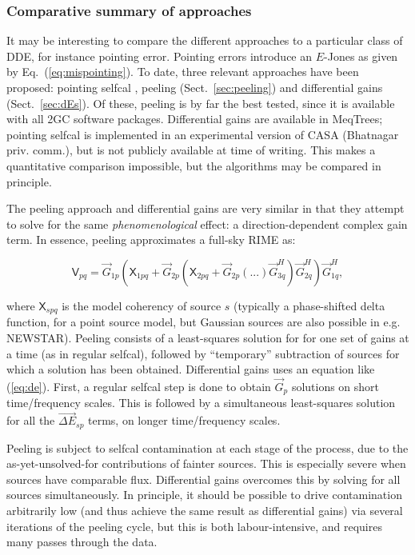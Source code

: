 \documentclass{aa}
\newcommand{\herm}{H}
\newcommand{\jones}[2]{\vec {#1}_{#2}}
\newcommand{\jonesT}[2]{\vec {#1}^{\herm}_{#2}}
\newcommand{\coh}[2]{\mathsf{{#1}}_{{#2}}}
\begin{document}
\subsubsection{Comparative summary of approaches}

It may be interesting to compare the different approaches to a particular class of DDE, for instance pointing error. Pointing errors introduce an $E$-Jones as given by Eq.~(\ref{eq:mispointing}). To date, three relevant approaches have been proposed: pointing selfcal \citep{SB:pointing}, peeling (Sect.~\ref{sec:peeling}) and differential gains (Sect.~\ref{sec:dEs}). Of these, peeling is by far the best tested, since it is available with all 2GC software packages. Differential gains are available in MeqTrees; pointing selfcal is implemented in an experimental version of CASA (Bhatnagar priv. comm.), but is not publicly available at time of writing. This makes a quantitative comparison impossible, but the algorithms may be compared in principle.

The peeling approach and differential gains are very similar in that they attempt to solve for the same \emph{phenomenological} effect: a direction-dependent complex gain term. In essence, peeling approximates a full-sky RIME as:

\[
\coh{V}{pq} = \jones{G}{1p}(\coh{X}{1pq} + \jones{G}{2p}(\coh{X}{2pq} + \jones{G}{2p}(...)\jonesT{G}{3q})\jonesT{G}{2q})\jonesT{G}{1q},
\]

where $\coh{X}{spq}$ is the model coherency of source $s$ (typically a phase-shifted delta function, for a point source model, but Gaussian sources are also possible in e.g. NEWSTAR). Peeling consists of a least-squares solution for for one set of gains at a time (as in regular selfcal), followed by ``temporary'' subtraction of sources for which a solution has been obtained. Differential gains uses an equation like (\ref{eq:de}). First, a regular selfcal step is done to obtain $\jones{G}{p}$ solutions on short time/frequency scales. This is followed by a simultaneous least-squares solution for all the $\jones{\Delta E}{sp}$ terms, on longer time/frequency scales. 

Peeling is subject to selfcal contamination at each stage of the process, due to the as-yet-unsolved-for contributions of fainter sources. This is especially severe when sources have comparable flux. Differential gains overcomes this by solving for all sources simultaneously. In principle, it should be possible to drive contamination arbitrarily low (and thus achieve the same result as differential gains) via several iterations of the peeling cycle, but this is both labour-intensive, and requires many passes through the data.
\end{document}
